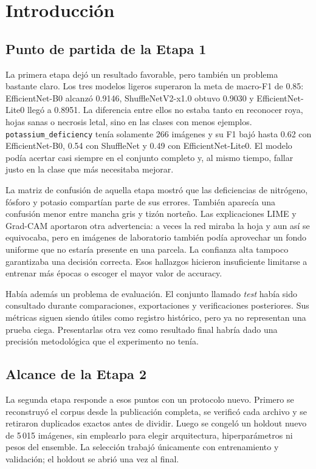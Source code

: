 \section{Introducción}

\subsection{Punto de partida de la Etapa 1}

La primera etapa dejó un resultado favorable, pero también un problema bastante
claro. Los tres modelos ligeros superaron la meta de macro-F1 de 0.85:
EfficientNet-B0 alcanzó 0.9146, ShuffleNetV2-x1.0 obtuvo 0.9030 y
EfficientNet-Lite0 llegó a 0.8951. La diferencia entre ellos no estaba tanto en
reconocer roya, hojas sanas o necrosis letal, sino en las clases con menos
ejemplos. \texttt{potassium\_deficiency} tenía solamente 266 imágenes y su F1
bajó hasta 0.62 con EfficientNet-B0, 0.54 con ShuffleNet y 0.49 con
EfficientNet-Lite0. El modelo podía acertar casi siempre en el conjunto
completo y, al mismo tiempo, fallar justo en la clase que más necesitaba
mejorar.

La matriz de confusión de aquella etapa mostró que las deficiencias de
nitrógeno, fósforo y potasio compartían parte de sus errores. También aparecía
una confusión menor entre mancha gris y tizón norteño. Las explicaciones LIME y
Grad-CAM aportaron otra advertencia: a veces la red miraba la hoja y aun así se
equivocaba, pero en imágenes de laboratorio también podía aprovechar un fondo
uniforme que no estaría presente en una parcela. La confianza alta tampoco
garantizaba una decisión correcta. Esos hallazgos hicieron insuficiente
limitarse a entrenar más épocas o escoger el mayor valor de accuracy.

Había además un problema de evaluación. El conjunto llamado \emph{test} había
sido consultado durante comparaciones, exportaciones y verificaciones
posteriores. Sus métricas siguen siendo útiles como registro histórico, pero ya
no representan una prueba ciega. Presentarlas otra vez como resultado final
habría dado una precisión metodológica que el experimento no tenía.

\subsection{Alcance de la Etapa 2}

La segunda etapa responde a esos puntos con un protocolo nuevo. Primero se
reconstruyó el corpus desde la publicación completa, se verificó cada archivo y
se retiraron duplicados exactos antes de dividir. Luego se congeló un holdout
nuevo de 5\,015 imágenes, sin emplearlo para elegir arquitectura,
hiperparámetros ni pesos del ensemble. La selección trabajó únicamente con
entrenamiento y validación; el holdout se abrió una vez al final.

